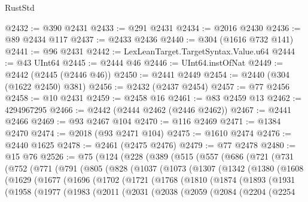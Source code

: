 \begin{lexlean}{RustStd}
\begin{coremodule}
@2432 := @390 @2431
@2433 := @291 @2431
@2434 := @2016 @2430
@2436 := @89 @2434 @117
@2437 := @2433 @2436
@2440 := @304 (@1616 @732 @141)
@2441 := @96 @2431
@2442 := LexLeanTarget.TargetSyntax.Value.u64
@2444 := @43 UInt64
@2445 := @2444 @46
@2446 := UInt64.instOfNat
@2449 := @2442 (@2445 (@2446 @46))
@2450 := @2441 @2449
@2454 := @2440 (@304 (@1622 @2450) @381)
@2456 := @2432 (@2437 @2454)
@2457 := @77 @2456
@2458 := @10 @2431
@2459 := @2458 @16
@2461 := @83 @2459 @13
@2462 := 4294967295
@2466 := @2442 (@2444 @2462 (@2446 @2462))
@2467 := @2441 @2466
@2469 := @93 @2467 @104
@2470 := @116 @2469
@2471 := @1384 @2470
@2474 := @2018 (@93 @2471 @104)
@2475 := @1610 @2474
@2476 := @2440 @1625
@2478 := @2461 (@2475 @2476)
@2479 := @77 @2478
@2480 := @15 @76
@2526 := @75
    (@124
      (@228
        (@389
          (@515
            (@557
              (@686
                (@721
                  (@731
                    (@752
                      (@771
                        (@791
                          (@805
                            (@828
                              (@1037
                                (@1073
                                  (@1307
                                    (@1342
                                      (@1380
                                        (@1608
                                          (@1629
                                            (@1677
                                              (@1696
                                                (@1702
                                                  (@1721
                                                    (@1768
                                                      (@1810
                                                        (@1874
                                                          (@1893
                                                            (@1931
                                                              (@1958
                                                                (@1977
                                                                  (@1983
                                                                    (@2011
                                                                      (@2031
                                                                        (@2038
                                                                          (@2059
                                                                            (@2084
                                                                              (@2204
                                                                                (@2254

\end{coremodule}
\end{lexlean}
